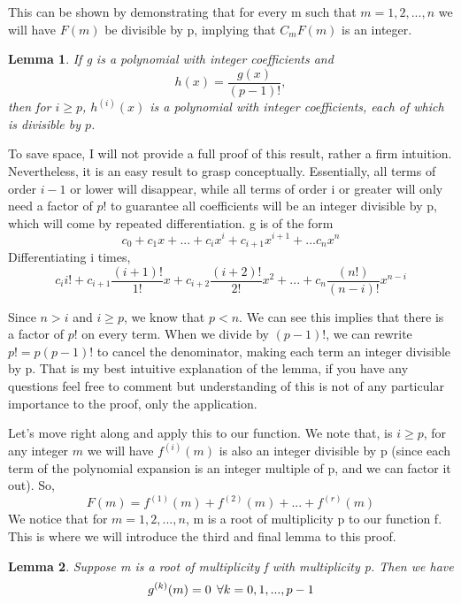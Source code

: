 \documentclass{article}
\newtheorem{lemma}{Lemma}
\begin{document}
\par
This can be shown by demonstrating that for every m such that $m=1,2,...,n$ we will have $F(m)$ be divisible by p, implying that $C_mF(m)$ is an integer. 
\begin{lemma}
If g is a polynomial with integer coefficients and 
\begin{equation*}
    h(x)=\frac{g(x)}{(p-1)!},
\end{equation*}
then for $i\geq p$, $h^{(i)}(x)$ is a polynomial with integer coefficients, each of which is divisible by $p$. 
\end{lemma} \par
To save space, I will not provide a full proof of this result, rather a firm intuition. Nevertheless, it is an easy result to grasp conceptually. Essentially, all terms of order $i-1$ or lower will disappear, while all terms of order i or greater will only need a factor of $p!$ to guarantee all coefficients will be an integer divisible by p, which will come by repeated differentiation. g is of the form
\begin{equation*}
    c_0+c_1x+...+c_ix^i+c_{i+1}x^{i+1}+...c_nx^n
\end{equation*}
Differentiating i times, 
\begin{equation*}
    c_i i!+c_{i+1}\frac{(i+1)!}{1!}x+c_{i+2}\frac{(i+2)!}{2!}x^2+...+c_{n}\frac{(n!)}{(n-i)!}x^{n-i}
\end{equation*} \par  
Since $n>i$ and $i \geq p$, we know that $p<n$. We can see this implies that there is a factor of $p!$ on every term. When we divide by $(p-1)!$, we can rewrite $p!=p(p-1)!$ to cancel the denominator, making each term an integer divisible by p. That is my best intuitive explanation of the lemma, if you have any questions feel free to comment but understanding of this is not of any particular importance to the proof, only the application. \par
Let's move right along and apply this to our function. We note that, is $i\geq p$, for any integer $m$ we will have $f^{(i)}(m)$ is also an integer divisible by p (since each term of the polynomial expansion is an integer multiple of p, and we can factor it out). So,
\begin{equation*}
    F(m)=f^{(1)}(m)+f^{(2)}(m)+...+f^{(r)}(m)
\end{equation*}
We notice that for $m=1,2,...,n$, m is a root of multiplicity p to our function f. This is where we will introduce the third and final lemma to this proof. 
\begin{lemma}
Suppose m is a root of multiplicity f with multiplicity p. Then we have
\begin{equation*}
    g^{(k)}(m)=0\, \hspace{0.1cm} \forall k=0,1,...,p-1
\end{equation*}
\end{lemma}
\end{document}

